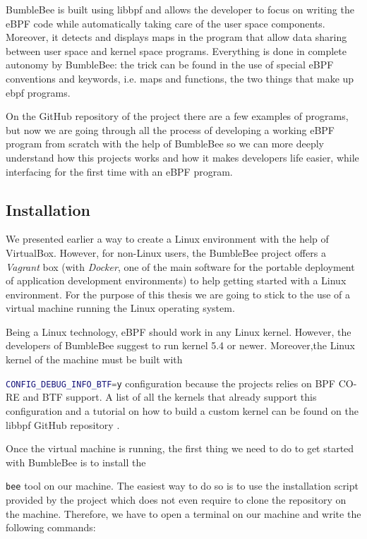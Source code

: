 BumbleBee is built using libbpf and allows the developer to focus on writing the eBPF code while automatically taking care of the user space components. 
Moreover, it detects and displays maps in the program that allow data sharing between user space and kernel space programs. 
Everything is done in complete autonomy by BumbleBee: the trick can be found in the use of special eBPF conventions and keywords, i.e. maps and functions, the two things that make up ebpf programs.

On the GitHub repository of the project there are a few examples of programs, but now we are going through all the process of developing a working eBPF program from scratch with the help of BumbleBee so we can more deeply understand how this projects works and how it makes developers life easier, while interfacing for the first time with an eBPF program.

\subsection{Installation}

We presented earlier a way to create a Linux environment with the help of VirtualBox.
However, for non-Linux users, the BumbleBee project offers a \textit{Vagrant} box \cite{BumbleBeeVagrant} (with \textit{Docker}, one of the main software for the portable deployment of application development environments) to help getting started with a Linux environment.
For the purpose of this thesis we are going to stick to the use of a virtual machine running the Linux operating system.

Being a Linux technology, eBPF should work in any Linux kernel.
However, the developers of BumbleBee suggest to run kernel 5.4 or newer.
Moreover,the Linux kernel of the machine must be built with \raggedright\colorbox{backcolour}{\lstinline[style=commandline, language=bash]|CONFIG_DEBUG_INFO_BTF=y|} configuration because the projects relies on BPF CO-RE and BTF support.
A list of all the kernels that already support this configuration and a tutorial on how to build a custom kernel can be found on the libbpf GitHub repository \cite{BTFKernelConfig}.

Once the virtual machine is running, the first thing we need to do to get started with BumbleBee is to install the \raggedright\colorbox{backcolour}{\lstinline[style=commandline, language=bash]|bee|} tool on our machine.
The easiest way to do so is to use the installation script provided by the project which does not even require to clone the repository on the machine.
Therefore, we have to open a terminal on our machine and write the following commands:

